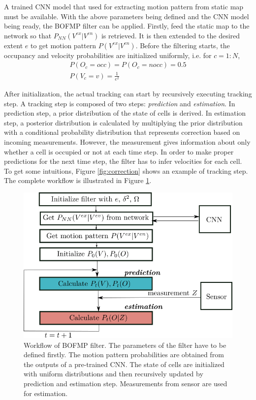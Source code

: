 A trained CNN model that used for extracting motion pattern from static map must be available. With the above parameters being defined and the CNN model being ready, the BOFMP filter can be applied. Firstly, feed the static map to the network so that $P_{NN}(V^{ex}|V^{en})$ is retrieved. It is then extended to the desired extent $e$ to get motion pattern $P(V^{ex}|V^{en})$. Before the filtering starts, the occupancy and velocity probabilities are initialized uniformly, i.e. for $c=1:N$,
\begin{gather}
P(O_c = occ) = P(O_c = nocc)=0.5 \\
P(V_c=v) = \frac{1}{e^2}
\end{gather}

 After initialization, the actual tracking can start by recursively executing tracking step. A tracking step is composed of two steps: \textit{prediction} and \textit{estimation}. In prediction step, a prior distribution of the state of cells is derived. In estimation step, a posterior distribution is calculated by multiplying the prior distribution with a conditional probability distribution that represents correction based on incoming measurements. However, the measurement gives information about only whether a cell is occupied or not at each time step. In order to make proper predictions for the next time step, the filter has to infer velocities for each cell. To get some intuitions, Figure \ref{fig:correction} shows an example of tracking step. The complete workflow is illustrated in Figure \ref{fig:fitering_workflow}.

\begin{figure}[H]
  \centering
    \includegraphics[width=.7\textwidth]{figures/filtering_workflow.png}
    \caption[Workflow of BOFMP filter.]{Workflow of BOFMP filter. The parameters of the filter have to be defined firstly. The motion pattern probabilities are obtained from the outputs of a pre-trained CNN. The state of cells are initialized with uniform distributions and then recursively updated by prediction and estimation step. Measurements from sensor are used for estimation.}
    \label{fig:fitering_workflow}
\end{figure}

